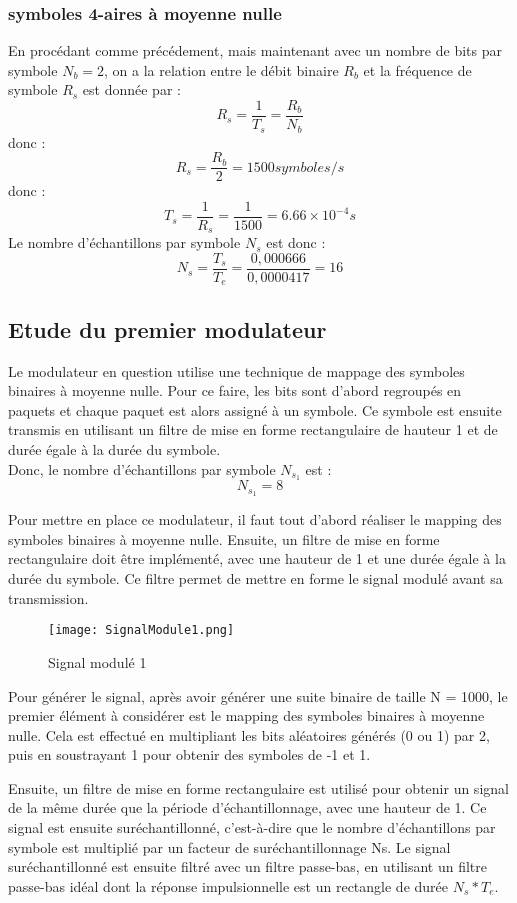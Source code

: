 \documentclass[11pt]{article}
\begin{document}
\subsubsection{symboles 4-aires à moyenne nulle}
En procédant comme précédement, mais maintenant avec un nombre de bits par symbole $N_b = 2$, on a la relation entre le débit binaire $R_b$ et la fréquence de symbole $R_s$ est donnée par :
$$ R_s = \frac{1}{T_s} = \frac{R_b}{N_b} $$
donc :
$$R_s = \frac{R_b}{2} = 1500symboles/s$$
donc :
$$T_s = \frac{1}{R_s} = \frac{1}{1500} = 6.66 \times 10^{-4} s$$
Le nombre d'échantillons par symbole $N_s$ est donc :
$$N_s = \frac{T_s}{T_e} = \frac{0,000666}{0,0000417} = 16$$

    \subsection{Etude du premier modulateur}
Le modulateur en question utilise une technique de mappage des symboles binaires à moyenne nulle. Pour ce faire, les bits sont d'abord regroupés en paquets et chaque paquet est alors assigné à un symbole. Ce symbole est ensuite transmis en utilisant un filtre de mise en forme rectangulaire de hauteur 1 et de durée égale à la durée du symbole.\\
Donc, le nombre d'échantillons par symbole $N_s_1$ est  :
$$N_s_1 = 8$$

Pour mettre en place ce modulateur, il faut tout d'abord réaliser le mapping des symboles binaires à moyenne nulle. Ensuite, un filtre de mise en forme rectangulaire doit être implémenté, avec une hauteur de 1 et une durée égale à la durée du symbole. Ce filtre permet de mettre en forme le signal modulé avant sa transmission.
    \begin{figure}[ht!]
            \centering
            \texttt{[image: SignalModule1.png]}
            \caption{Signal modulé 1 \label{fig : SignalModule1}}
        \end{figure}

        Pour générer le signal, après avoir générer une suite binaire de taille N = 1000, le premier élément à considérer est le mapping des symboles binaires à moyenne nulle. Cela est effectué en multipliant les bits aléatoires générés (0 ou 1) par 2, puis en soustrayant 1 pour obtenir des symboles de -1 et 1.

Ensuite, un filtre de mise en forme rectangulaire est utilisé pour obtenir un signal de la même durée que la période d'échantillonnage, avec une hauteur de 1. Ce signal est ensuite suréchantillonné, c'est-à-dire que le nombre d'échantillons par symbole est multiplié par un facteur de suréchantillonnage Ns. Le signal suréchantillonné est ensuite filtré avec un filtre passe-bas, en utilisant un filtre passe-bas idéal dont la réponse impulsionnelle est un rectangle de durée $N_s*T_e$.
\end{document}
